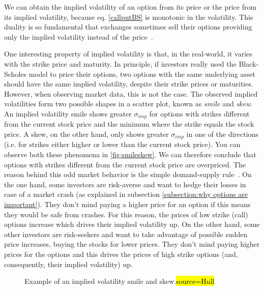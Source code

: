 We can obtain the implied volatility of an option from its price or the price from its implied volatility, because eq. \eqref{callputBS} is monotonic in the volatility. This duality is so fundamental that exchanges sometimes sell their options providing only the implied volatility instead of the price~\citep{Wilmott}.

One interesting property of implied volatility is that, in the real-world, it varies with the strike price and maturity. In principle, if investors really used the Black-Scholes model to price their options, two options with the same underlying asset should have the same implied volatility, despite their strike prices or maturities.
However, when observing market data, this is not the case. The observed implied volatilities form two possible shapes in a scatter plot, known as \emph{smile} and \emph{skew}.
An implied volatility smile shows greater $\sigma_{imp}$ for options with strikes different from the current stock price and the minimum where the strike equals the stock price. A skew, on the other hand, only shows greater $\sigma_{imp}$ in one of the directions (i.e. for strikes either higher or lower than the current stock price). You can observe both these phenomena in \autoref{fig:smileskew}.
We can therefore conclude that options with strikes different from the current stock price are overpriced.
The reason behind this odd market behavior is the simple demand-supply rule~\citep{Wilmott}. On the one hand, some investors are risk-averse and want to hedge their losses in case of a market crash (as explained in subsection \ref{subsection:why options are important}). They don't mind paying a higher price for an option if this means they would be safe from crashes. For this reason, the prices of low strike (call) options increase which drives their implied volatility up. On the other hand, some other investors are risk-seekers and want to take advantage of possible sudden price increases, buying the stocks for lower prices. They don't mind paying higher prices for the options and this drives the prices of high strike options (and, consequently, their implied volatility) up.
    
    
\begin{figure}[!htb]
  \begin{subfigmatrix}{2}
  \end{subfigmatrix}
  \caption[Example of an implied volatility smile and skew.]{Example of an implied volatility smile and skew.\hl{source=Hull}}
  \label{fig:smileskew}
\end{figure}

